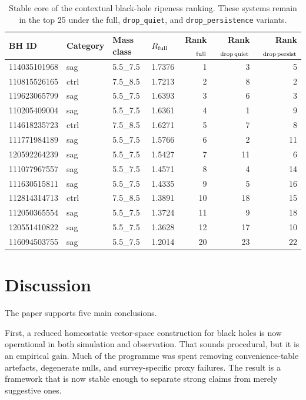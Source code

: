 \documentclass[11pt]{article}
\begin{document}
\begin{table}[H]
\centering
\caption{Stable core of the contextual black-hole ripeness ranking. These systems remain in the top 25 under the full, \texttt{drop\_quiet}, and \texttt{drop\_persistence} variants.}
\label{tab:stable_core}
\small
\begin{tabular}{llllrrr}
\toprule
BH ID & Category & Mass class & $R_{\rm full}$ & Rank$_{\rm full}$ & Rank$_{\rm drop\,quiet}$ & Rank$_{\rm drop\,persist}$ \\
\midrule
114035101968 & sag  & 5.5\_7.5 & 1.7376 & 1  & 3  & 5  \\
110815526165 & ctrl & 7.5\_8.5 & 1.7213 & 2  & 8  & 2  \\
119623065799 & sag  & 5.5\_7.5 & 1.6393 & 3  & 6  & 3  \\
110205409004 & sag  & 5.5\_7.5 & 1.6361 & 4  & 1  & 9  \\
114618235723 & ctrl & 7.5\_8.5 & 1.6271 & 5  & 7  & 8  \\
111771984189 & sag  & 5.5\_7.5 & 1.5766 & 6  & 2  & 11 \\
120592264239 & sag  & 5.5\_7.5 & 1.5427 & 7  & 11 & 6  \\
111077967557 & sag  & 5.5\_7.5 & 1.4571 & 8  & 4  & 14 \\
111630515811 & sag  & 5.5\_7.5 & 1.4335 & 9  & 5  & 16 \\
112814314713 & ctrl & 7.5\_8.5 & 1.3891 & 10 & 18 & 15 \\
112050365554 & sag  & 5.5\_7.5 & 1.3724 & 11 & 9  & 18 \\
120551410822 & sag  & 5.5\_7.5 & 1.3628 & 12 & 17 & 10 \\
116094503755 & sag  & 5.5\_7.5 & 1.2014 & 20 & 23 & 22 \\
\bottomrule
\end{tabular}
\end{table}

\section{Discussion}

The paper supports five main conclusions.

First, a reduced homeostatic vector-space construction for black holes is now operational in both simulation and observation. That sounds procedural, but it is an empirical gain. Much of the programme was spent removing convenience-table artefacts, degenerate nulls, and survey-specific proxy failures. The result is a framework that is now stable enough to separate strong claims from merely suggestive ones.
\end{document}
